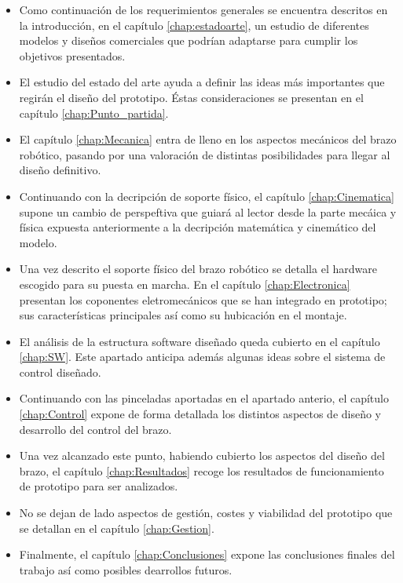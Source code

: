 \begin{itemize}
    \item Como continuación de los requerimientos generales se encuentra descritos en la introducción, en el capítulo \ref{chap:estadoarte}, un estudio de diferentes modelos y diseños comerciales que podrían adaptarse para cumplir los objetivos presentados.
    \item El estudio del estado del arte ayuda a definir las ideas más importantes que regirán el diseño del prototipo. Éstas consideraciones se presentan en el capítulo \ref{chap:Punto_partida}.
    \item El capítulo \ref{chap:Mecanica} entra de lleno en los aspectos mecánicos del brazo robótico, pasando por una valoración de distintas posibilidades para llegar al diseño definitivo.
    \item Continuando con la decripción de soporte físico, el capítulo \ref{chap:Cinematica} supone un cambio de perspeftiva que guiará al lector desde la parte mecáica y física expuesta anteriormente a la decripción matemática y cinemático del modelo.
    \item Una vez descrito el soporte físico del brazo robótico se detalla el hardware escogido para su puesta en marcha. En el capítulo \ref{chap:Electronica} presentan los coponentes eletromecánicos que se han integrado en prototipo; sus características principales así como su hubicación en el montaje.
    \item El análisis de la estructura software diseñado queda cubierto en el capítulo \ref{chap:SW}. Este apartado anticipa además algunas ideas sobre el sistema de control diseñado.
    \item Continuando con las pinceladas aportadas en el apartado anterio, el capítulo \ref{chap:Control} expone de forma detallada los distintos aspectos de diseño y desarrollo del control del brazo.
    \item Una vez alcanzado este punto, habiendo cubierto los aspectos del diseño del brazo, el capítulo \ref{chap:Resultados} recoge los resultados de funcionamiento de prototipo para ser analizados.
    \item No se dejan de lado aspectos de gestión, costes y viabilidad del prototipo que se detallan en el capítulo \ref{chap:Gestion}.
    \item Finalmente, el capítulo \ref{chap:Conclusiones} expone las conclusiones finales del trabajo así como posibles dearrollos futuros.
\end{itemize}

